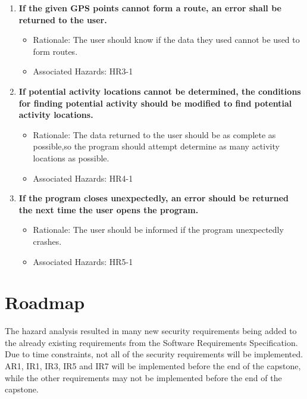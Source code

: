 \documentclass{article}
\begin{document}
\begin{enumerate}[{IR}1. ]
\item \label{IR5} \textbf{If the given GPS points cannot form a route, an error shall be returned to the user.}
    \begin{itemize} 
        \item Rationale: The user should know if the data they used cannot be used to form routes.
         \item Associated Hazards: HR3-1
    \end{itemize}
\item \label{IR6} \textbf{If potential activity locations cannot be determined, the conditions for finding potential activity should be modified to find potential activity locations.}
    \begin{itemize} 
        \item Rationale: The data returned to the user should be as complete as possible,so the program should attempt determine as many activity locations as possible.
         \item Associated Hazards: HR4-1
    \end{itemize} 
\item \label{IR7} \textbf{If the program closes unexpectedly, an error should be returned the next time the user opens the program.}
    \begin{itemize} 
        \item Rationale: The user should be informed if the program unexpectedly crashes.
         \item Associated Hazards: HR5-1
    \end{itemize} 
\end{enumerate}

\section{Roadmap}
The hazard analysis resulted in many new security requirements being added to the already existing requirements from the Software Requirements Specification. Due to time constraints, not all of the security requirements will be implemented. AR1, IR1, IR3, IR5 and IR7 will be implemented before the end of the capstone, while the other requirements may not be implemented before the end of the capstone.
\end{document}
